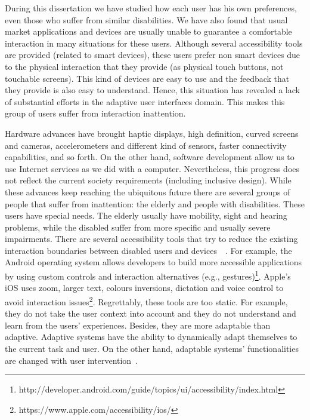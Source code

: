 During this dissertation we have studied how each user has his own preferences,
even those who suffer from similar disabilities. We have also found that usual 
market applications and devices are usually unable to guarantee a comfortable 
interaction in many situations for these users. Although several accessibility 
tools are provided (related to smart devices), these users prefer non smart 
devices due to the physical interaction that they provide (as physical touch 
buttons, not touchable screens). This kind of devices are easy to use and the 
feedback that they provide is also easy to understand. Hence, this situation has
revealed a lack of substantial efforts in the adaptive user interfaces domain. 
This makes this group of users suffer from interaction inattention.

Hardware advances have brought haptic displays, high definition, curved 
screens and cameras, accelerometers and different kind of sensors, faster 
connectivity capabilities, and so forth. On the other hand, software development
allow us to use Internet services as we did with a computer. Nevertheless,
this progress does not reflect the current society requirements (including
inclusive design). While these advances keep reaching the ubiquitous future
there are several groups of people that suffer from inattention: the elderly and
people with disabilities. These users have special needs. The elderly usually
have mobility, sight and hearing problems, while the disabled suffer from more
specific and usually severe impairments. There are several accessibility tools
that try to reduce the existing interaction boundaries between disabled users
and devices~\citep{gregor_designing_2002}~\citep{burgstahler_designing_2002}.
For example, the Android operating system allows developers to build more accessible 
applications by using custom controls and interaction alternatives (e.g., 
gestures)\footnote{http://developer.android.com/guide/topics/ui/accessibility/index.html}.
Apple's iOS uses zoom, larger text, colours inversions, dictation and voice
control to avoid interaction issues\footnote{https://www.apple.com/accessibility/ios/}.
Regrettably, these tools are too static. For example, they do not take the user
context into account and they do not understand and learn from the users'
experiences. Besides, they are more adaptable than adaptive. Adaptive systems
have the ability to dynamically adapt themselves to the current task and user.
On the other hand, adaptable systems' functionalities are changed with user
intervention~\citep{fischer_user_2001}.

